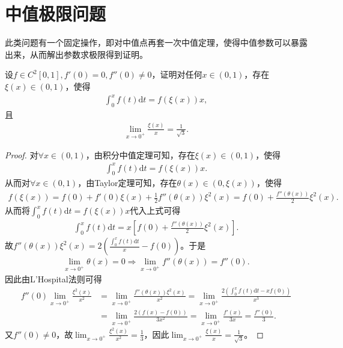 \documentclass[../../main.tex]{subfiles}%
\begin{document}
\section{中值极限问题}

此类问题有一个固定操作，即对中值点再套一次中值定理，使得中值参数可以暴露出来，从而解出参数求极限得到证明。

\begin{example}
设$f\in C^2[0,1],f'(0)=0,f''(0)\neq 0$，证明对任何$x\in(0,1)$，存在$\xi(x)\in(0,1)$，使得
\begin{align*}
\int_0^x f(t)\mathrm{d}t = f(\xi(x))x,
\end{align*}
且
\begin{align*}
\lim_{x\to 0^+}\frac{\xi(x)}{x}=\frac{1}{\sqrt{3}}.
\end{align*} 
\end{example}
\begin{proof}

对$\forall x\in(0,1)$，由积分中值定理可知，存在$\xi(x)\in(0,1)$，使得
\begin{align*}
\int_0^x f(t) \mathrm{d}t = f(\xi(x))x.
\end{align*}
从而对$\forall x\in(0,1)$，由Taylor定理可知，存在$\theta(x)\in(0,\xi(x))$，使得
\begin{align*}
f(\xi(x)) = f(0) + f'(0)\xi(x) + \frac{1}{2}f''(\theta(x))\xi^2(x) = f(0) + \frac{f''(\theta(x))}{2}\xi^2(x).
\end{align*}
从而将$\int_0^x f(t)\mathrm{d}t = f(\xi(x))x$代入上式可得
\begin{align*}
\int_0^x f(t)\mathrm{d}t = x\left[f(0) + \frac{f''(\theta(x))}{2}\xi^2(x)\right].
\end{align*}
故$f''(\theta(x))\xi^2(x) = 2\left(\frac{\int_0^x f(t)\mathrm{d}t}{x} - f(0)\right)$。于是
\begin{align*}
\lim_{x\to 0^+}\theta(x) = 0 \Rightarrow \lim_{x\to 0^+}f''(\theta(x)) = f''(0).
\end{align*}
因此由L'Hospital法则可得
\begin{align*}
f''(0)\lim_{x\to 0^+}\frac{\xi^2(x)}{x^2} &= \lim_{x\to 0^+}\frac{f''(\theta(x))\xi^2(x)}{x^2} = \lim_{x\to 0^+}\frac{2\left(\int_0^x f(t)\mathrm{d}t - xf(0)\right)}{x^3}\\
&= \lim_{x\to 0^+}\frac{2\left(f(x) - f(0)\right)}{3x^2} = \lim_{x\to 0^+}\frac{f'(x)}{3x} = \frac{f''(0)}{3}.
\end{align*}
又$f''(0)\neq 0$，故$\lim_{x\to 0^+}\frac{\xi^2(x)}{x^2} = \frac{1}{3}$，因此$\lim_{x\to 0^+}\frac{\xi(x)}{x} = \frac{1}{\sqrt{3}}$。 

\end{proof}
\end{document}
